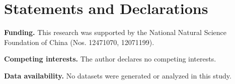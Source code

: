 \documentclass[11pt,reqno]{amsart}
\theoremstyle{definition}
\numberwithin{equation}{section}
\begin{document}
\section*{Statements and Declarations}

\noindent\textbf{Funding.}
This research was supported by the National Natural Science Foundation of
China (Nos. 12471070, 12071199).

\vspace{0.1cm}

\noindent\textbf{Competing interests.}
The author declares no competing interests.

\vspace{0.1cm}

\noindent\textbf{Data availability.}
No datasets were generated or analyzed in this study.

\vspace{0.1cm}

\end{document}
